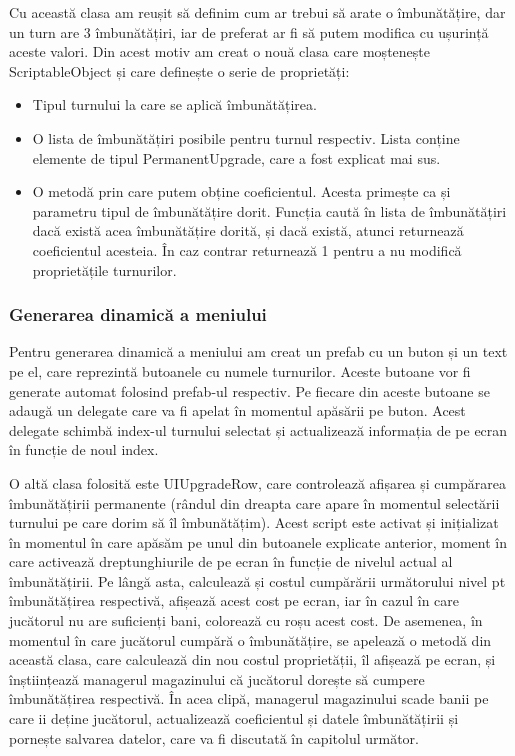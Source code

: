 \documentclass[12pt, a4paper]{article}
\begin{document}
	Cu această clasa am reușit să definim cum ar trebui să arate o îmbunătățire, dar un turn are 3 îmbunătățiri, iar de preferat ar fi să putem modifica cu ușurință aceste valori. Din acest motiv am creat o nouă clasa care moștenește ScriptableObject și care definește o serie de proprietăți:
	
	\begin{itemize}
		\item Tipul turnului la care se aplică îmbunătățirea.
		\item O lista de îmbunătățiri posibile pentru turnul respectiv. Lista conține elemente de tipul PermanentUpgrade, care a fost explicat mai sus.
		\item O metodă prin care putem obține coeficientul. Acesta primește ca și parametru tipul de îmbunătățire dorit. Funcția caută în lista de îmbunătățiri dacă există acea îmbunătățire dorită, și dacă există, atunci returnează coeficientul acesteia. În caz contrar returnează 1 pentru a nu modifică proprietățile turnurilor.
	\end{itemize}
	
	\subsubsection{Generarea dinamică a meniului}
	
	Pentru generarea dinamică a meniului am creat un prefab cu un buton și un text pe el, care reprezintă butoanele cu numele turnurilor. Aceste butoane vor fi generate automat folosind prefab-ul respectiv. Pe fiecare din aceste butoane se adaugă un delegate care va fi apelat în momentul apăsării pe buton. Acest delegate schimbă index-ul turnului selectat și actualizează informația de pe ecran în funcție de noul index.
	\newline
	
	O altă clasa folosită este UIUpgradeRow, care controlează afișarea și cumpărarea îmbunătățirii permanente (rândul din dreapta care apare în momentul selectării turnului pe care dorim să îl îmbunătățim). Acest script este activat și inițializat în momentul în care apăsăm pe unul din butoanele explicate anterior, moment în care activează dreptunghiurile de pe ecran în funcție de nivelul actual al îmbunătățirii. Pe lângă asta, calculează și costul cumpărării următorului nivel pt îmbunătățirea respectivă, afișează acest cost pe ecran, iar în cazul în care jucătorul nu are suficienți bani, colorează cu roșu acest cost. De asemenea, în momentul în care jucătorul cumpără o îmbunătățire, se apelează o metodă din această clasa, care calculează din nou costul proprietății, îl afișează pe ecran, și înștiințează managerul magazinului că jucătorul dorește să cumpere îmbunătățirea respectivă. În acea clipă, managerul magazinului scade banii pe care ii deține jucătorul, actualizează coeficientul și datele îmbunătățirii și pornește salvarea datelor, care va fi discutată în capitolul următor.
	\newline
	
\end{document}
